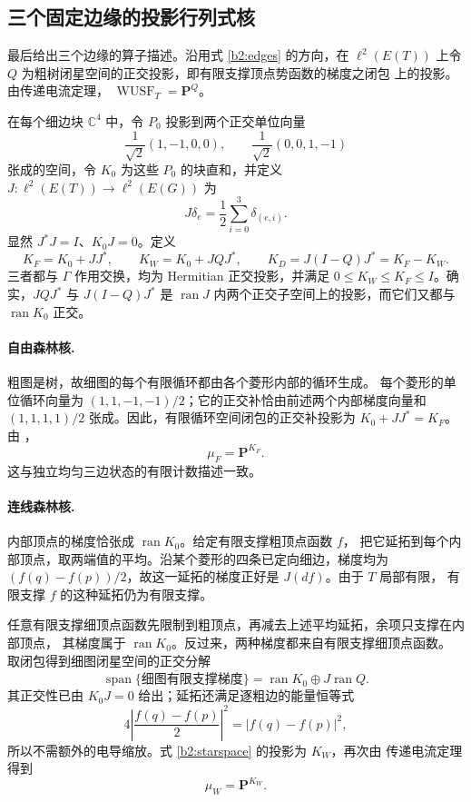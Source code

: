 \documentclass[UTF8,zihao=-4,a4paper]{ctexart}
\numberwithin{equation}{section}
\begin{document}
\subsection{三个固定边缘的投影行列式核}\label{b2:dpp}

最后给出三个边缘的算子描述。沿用式 \eqref{b2:edges} 的方向，在
$\ell^2(E(T))$ 上令 $Q$ 为粗树闭星空间的正交投影，即有限支撑顶点势函数的梯度之闭包
上的投影。由传递电流定理\cite[Theorem~7.8]{BLPS}，
$\operatorname{WUSF}_T=\mathbf P^Q$。

在每个细边块 $\mathbb C^4$ 中，令 $P_0$ 投影到两个正交单位向量
\[
 \frac1{\sqrt2}(1,-1,0,0),\qquad
 \frac1{\sqrt2}(0,0,1,-1)
\]
张成的空间，令 $K_0$ 为这些 $P_0$ 的块直和，并定义
$J:\ell^2(E(T))\to\ell^2(E(G))$ 为
\begin{equation}\label{b2:isometry}
 J\delta_e=\frac12\sum_{i=0}^3\delta_{(e,i)}.
\end{equation}
显然 $J^*J=I$、$K_0J=0$。定义
\begin{equation}\label{b2:kernels}
 K_F=K_0+JJ^*,\qquad
 K_W=K_0+JQJ^*,\qquad
 K_D=J(I-Q)J^*=K_F-K_W.
\end{equation}
三者都与 $\Gamma$ 作用交换，均为 Hermitian 正交投影，并满足
$0\le K_W\le K_F\le I$。确实，$JQJ^*$ 与 $J(I-Q)J^*$ 是
$\operatorname{ran}J$ 内两个正交子空间上的投影，而它们又都与
$\operatorname{ran}K_0$ 正交。

\paragraph{自由森林核.}
粗图是树，故细图的每个有限循环都由各个菱形内部的循环生成。
每个菱形的单位循环向量为 $(1,1,-1,-1)/2$；它的正交补恰由前述两个内部梯度向量和
$(1,1,1,1)/2$ 张成。因此，有限循环空间闭包的正交补投影为
$K_0+JJ^*=K_F$。由 \cite[Theorem~7.8]{BLPS}，
\begin{equation}\label{b2:fusfkernel}
 \mu_F=\mathbf P^{K_F}.
\end{equation}
这与独立均匀三边状态的有限计数描述一致。

\paragraph{连线森林核.}
内部顶点的梯度恰张成 $\operatorname{ran}K_0$。给定有限支撑粗顶点函数 $f$，
把它延拓到每个内部顶点，取两端值的平均。沿某个菱形的四条已定向细边，梯度均为
$(f(q)-f(p))/2$，故这一延拓的梯度正好是 $J(df)$。由于 $T$ 局部有限，
有限支撑 $f$ 的这种延拓仍为有限支撑。

任意有限支撑细顶点函数先限制到粗顶点，再减去上述平均延拓，余项只支撑在内部顶点，
其梯度属于 $\operatorname{ran}K_0$。反过来，两种梯度都来自有限支撑细顶点函数。
取闭包得到细图闭星空间的正交分解
\begin{equation}\label{b2:starspace}
 \overline{\operatorname{span}\{\text{细图有限支撑梯度}\}}
 =\operatorname{ran}K_0\mathbin{\oplus}J\operatorname{ran}Q.
\end{equation}
其正交性已由 $K_0J=0$ 给出；延拓还满足逐粗边的能量恒等式
\[
 4\left|\frac{f(q)-f(p)}2\right|^2=|f(q)-f(p)|^2,
\]
所以不需额外的电导缩放。式 \eqref{b2:starspace} 的投影为 $K_W$，再次由
传递电流定理得到
\begin{equation}\label{b2:wusfkernel}
 \mu_W=\mathbf P^{K_W}.
\end{equation}
\end{document}

